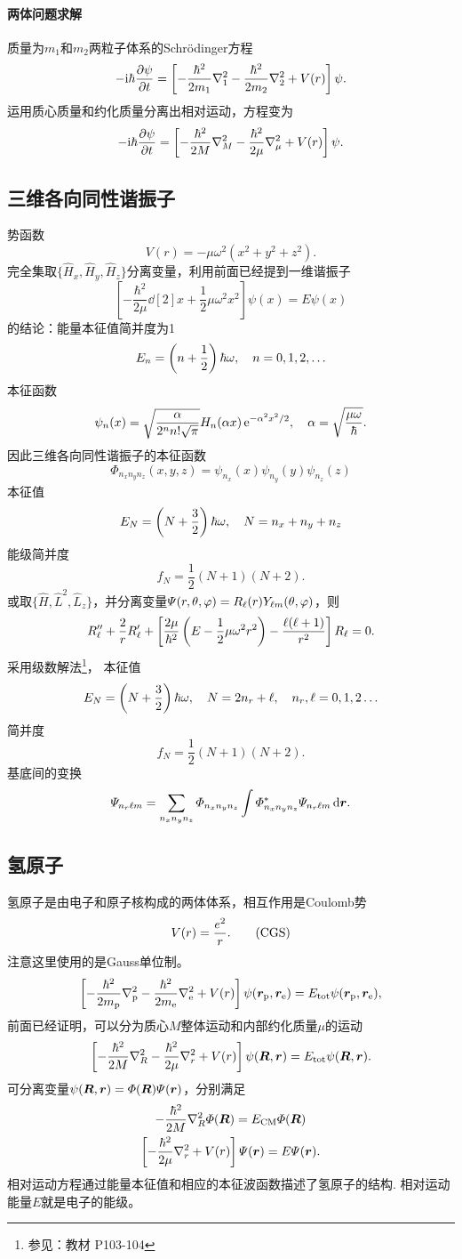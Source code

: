 \paragraph*{两体问题求解}质量为$m_1$和$m_2$两粒子体系的Schrödinger方程
\[
	-\mathrm{i}\hbar\frac{\partial^{\;\!\!}\psi}{\partial t^{\;\!\!}}=\left[-\frac{\hbar^2}{2m_1}\nabla_1^2-\frac{\hbar^2}{2m_2}\nabla_2^2+V(r)\right]\psi.
\]
运用质心质量和约化质量分离出相对运动，\Schr 方程变为
\[
	-\mathrm{i}\hbar\frac{\partial^{\;\!\!}\psi}{\partial t^{\;\!\!}}=\left[-\frac{\hbar^2}{2M}\nabla_M^2-\frac{\hbar^2}{2\mu}\nabla_\mu^2+V(r)\right]\psi.
\]
\subsection{三维各向同性谐振子}
势函数
\[
V(r)=-\mu\omega^2(x^2 +y^2 +z^2).
\]
完全集取$\{\hat H_x,\hat H_y,\hat H_z\}$分离变量，利用前面已经提到一维谐振子
\[
	\left[-\frac{\hbar^{2}}{2 \mu}\dd[2]x+\frac{1}{2} \mu \omega^{2} x^{2}\right] \psi(x)=E \psi(x)
\]
的结论：能量本征值简并度为1
\[
E_{n}=\left(n+\frac12\right)\hbar \omega, \quad n=0,1,2, \ldots
\]
本征函数
\[
	\psi_n(x)=\sqrt{\frac{\alpha}{2^nn!\sqrt\pi}}H_n(\alpha x)\mathop{}\!\mathrm{e}^{-\alpha^2x^2/2},\quad\alpha=\sqrt{\frac{\mu\omega}\hbar}.
\]
因此三维各向同性谐振子的本征函数
\[
	\varPhi_{n_xn_yn_z}(x,y,z)=\psi_{n_x}(x)\psi_{n_y}(y)\psi_{n_z}(z)
\]
本征值
\[
E_N=\left(N+\frac32\right)\hbar\omega,\quad N=n_x+n_y+n_z
\]
能级简并度
\[
f_N=\frac12(N+1)(N+2).
\]
或取$\{\hat H,\hat L^2,\hat L_z\}$，并分离变量$\varPsi(r,\theta,\varphi)=R_\ell(r)Y_{\ell m}(\theta,\varphi)$，则
\[
R_\ell''+\frac2rR_\ell'+\left[\frac{2\mu}{\hbar^2}\left(E-\frac12\mu\omega^2r^2\right)-\frac{\ell(\ell+1)}{r^2}\right]R_\ell=0.
\]
采用级数解法\footnote{参见：教材 P103-104}，
本征值
\[
E_N=\left(N+\frac32\right)\hbar\omega,\quad N=2n_r+\ell,\quad n_r,\ell=0,1,2\ldots
\]
简并度
\[
f_N=\frac12(N+1)(N+2).
\]
基底间的变换
\[
	\varPsi_{n_r\ell m}=\sum_{n_xn_yn_z}\varPhi_{n_xn_yn_z}\int\varPhi_{n_xn_yn_z}^\ast\varPsi_{n_r\ell m}\mathop{}\!\mathrm{d}\bm r.
\]
\subsection{氢原子}
氢原子是由电子和原子核构成的两体体系，相互作用是Coulomb势 %
\[
	V(r)=\frac{e^2}r.\CGS
\]
注意这里使用的是Gauss单位制。
\[
	\left[-\frac{\hbar^2}{2m_\mathrm p}\nabla_\mathrm p^2-\frac{\hbar^2}{2m_\mathrm e}\nabla_\mathrm e^2+V(r)\right]\psi(\bm r_\mathrm p,\bm r_\mathrm e)=E_\mathrm{tot}\psi(\bm r_\mathrm p,\bm r_\mathrm e),
\]
前面已经证明，可以分为质心$M$整体运动和内部约化质量$\mu$的运动
\[
	\left[-\frac{\hbar^2}{2M}\nabla_R^2-\frac{\hbar^2}{2\mu}\nabla_r^2+V(r)\right]\psi(\bm R,\bm r)=E_\mathrm{tot}\psi(\bm R,\bm r).
\]
可分离变量$\psi(\bm R,\bm r)=\varPhi(\bm R)\varPsi(\bm r)$，分别满足
\begin{gather*}
	-\frac{\hbar^2}{2M}\nabla_R^2\varPhi(\bm R)=E_\mathrm{CM}\varPhi(\bm R)\\
	\left[-\frac{\hbar^2}{2\mu}\nabla_r^2+V(r)\right]\varPsi(\bm r)=E\varPsi(\bm r).
\end{gather*}
相对运动方程通过能量本征值和相应的本征波函数描述了氢原子的结构. 相对运动能量$E$就是电子的能级。

